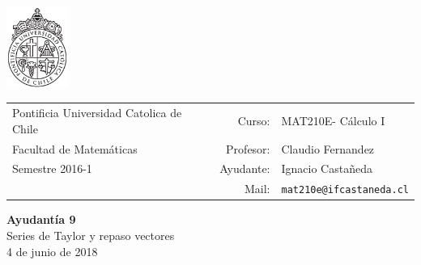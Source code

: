 \documentclass[12pt]{article}
\makeatletter
\newcommand{\ayudantia}{{\sc Ayudantía 9}}
\newcommand{\tituloayu}{Series de Taylor y repaso vectores}
\newcommand{\fecha}{4 de junio de 2018}
\newcommand{\sigla}{MAT210E}
\newcommand{\nombre}{Cálculo I}
\newcommand{\profesor}{Claudio Fernandez}
\newcommand{\ano}{2016}
\newcommand{\semestre}{1}
\newcommand{\mail}{mat210e@ifcastaneda.cl}
\makeatother
\begin{document}
\thispagestyle{empty}

\begin{minipage}{2cm}
	\includegraphics[width=2cm]{../../../../img/logo.pdf}
	\vspace{0.5cm}
\end{minipage}
\begin{minipage}{\linewidth}
	\begin{tabular}{lrl}
		{\scriptsize\sc Pontificia Universidad Catolica de Chile} & \hspace*{0.7in}Curso: &
		\sigla  - \nombre\\
		{\sc Facultad de Matemáticas}&
		Profesor: & \profesor \\
		{\sc Semestre \ano-\semestre} & Ayudante: & {Ignacio Castañeda}\\
		& {Mail:} & \texttt{\mail}
	\end{tabular}
\end{minipage}

\vspace{-10mm}
\begin{center}
	{\LARGE\bf \ayudantia}\\
	\vspace{0.1cm}
	{\tituloayu}\\
	\vspace{0.1cm}
	\fecha\\
	\vspace{0.4cm}
\end{center}
\end{document}
